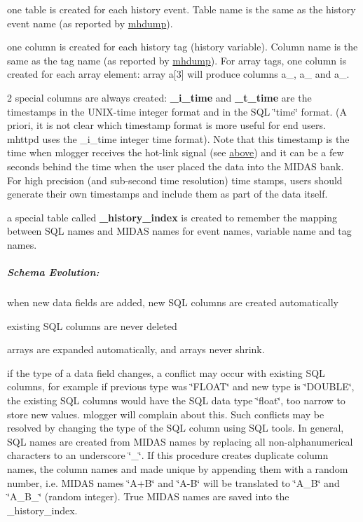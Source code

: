 \begin{DoxyItemize}
\item one table is created for each history event. Table name is the same as the history event name (as reported by \hyperlink{F_History_logging_F_mhdump_utility}{mhdump}). 
\item one column is created for each history tag (history variable). Column name is the same as the tag name (as reported by \hyperlink{F_History_logging_F_mhdump_utility}{mhdump}). For array tags, one column is created for each array element: array a\mbox{[}3\mbox{]} will produce columns a\_, a\_ and a\_. 
\item 2 special columns are always created: {\bfseries \_\-i\_\-time} and {\bfseries \_\-t\_\-time} are the timestamps in the UNIX-\/time integer format and in the SQL \char`\"{}time\char`\"{} format. (A priori, it is not clear which timestamp format is more useful for end users. mhttpd uses the \_\-i\_\-time integer time format). Note that this timestamp is the time when mlogger receives the hot-\/link signal (see \hyperlink{F_History_logging_F_history_hot_link}{above}) and it can be a few seconds behind the time when the user placed the data into the MIDAS bank. For high precision (and sub-\/second time resolution) time stamps, users should generate their own timestamps and include them as part of the data itself. 
\item a special table called {\bfseries \_\-history\_\-index} is created to remember the mapping between SQL names and MIDAS names for event names, variable name and tag names. 
\end{DoxyItemize}\hypertarget{F_History_logging_F_SQL_Schema}{}\subparagraph{Schema Evolution:}\label{F_History_logging_F_SQL_Schema}

\begin{DoxyItemize}
\item when new data fields are added, new SQL columns are created automatically 
\item existing SQL columns are never deleted 
\item arrays are expanded automatically, and arrays never shrink. 
\item if the type of a data field changes, a conflict may occur with existing SQL columns, for example if previous type was \char`\"{}FLOAT\char`\"{} and new type is \char`\"{}DOUBLE\char`\"{}, the existing SQL columns would have the SQL data type \char`\"{}float\char`\"{}, too narrow to store new values. mlogger will complain about this. Such conflicts may be resolved by changing the type of the SQL column using SQL tools. In general, SQL names are created from MIDAS names by replacing all non-\/alphanumerical characters to an underscore \char`\"{}\_\-\char`\"{}. If this procedure creates duplicate column names, the column names and made unique by appending them with a random number, i.e. MIDAS names \char`\"{}A+B\char`\"{} and \char`\"{}A-\/B\char`\"{} will be translated to \char`\"{}A\_\-B\char`\"{} and \char`\"{}A\_\-B\_\char`\"{} (random integer). True MIDAS names are saved into the \_\-history\_\-index. 
\end{DoxyItemize}

